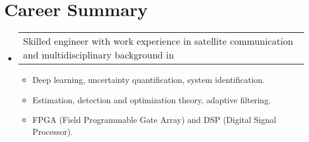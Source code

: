 \section{Career Summary}

\begin{itemize}[leftmargin=0.15in, label={}] %
    \item   \begin{tabular*}{0.2\textwidth}{l} Skilled engineer with work experience in satellite communication and multidisciplinary background in \end{tabular*}\vspace{-7pt} %
            \begin{itemize} %
                \item{Deep learning, uncertainty quantification, system identification. \vspace{-2pt}} %
                \item{Estimation, detection and optimization theory, adaptive filtering. \vspace{-2pt}} %
                \item{FPGA (Field Programmable Gate Array) and DSP (Digital Signal Processor). \vspace{-2pt}} %
            \end{itemize}\vspace{-5pt}
\end{itemize} %
